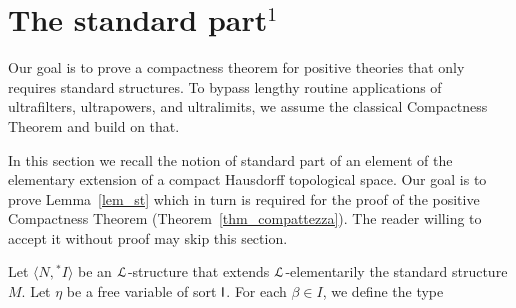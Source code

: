 \documentclass{amsproc}
\begin{document}
\begin{comment}
  \ceq{\hfill M\models\varphi(a)}{\Leftrightarrow}{N\models\varphi(fa)}

  for every $a\in({\rm dom }f)^{|x|}$ and every formula $\varphi(x)\in{\EuScript L}^{\rm p}$ without quantifiers of sort ${\sf H}$.
\end{fact}

\begin{proof}
  The equivalence is trivial for formulas in ${\EuScript L}_{\sf H}$ so we only consider atomic formulas of the form $t\in C$.
  Implication $\Rightarrow$ holds by definition. 
  Vice versa, if $M\models \tau(a)\notin C$ then, by normality,  $M\models \tau(a)\in\tilde{C}$ for some compact $\tilde C$ disjoint of $C$.
  By the definition of partial embedding, $N\models \tau(a)\in\tilde{C}$.
  Hence $N\models \tau(a)\notin C$.
  Induction is immediate.
\end{proof}
  
\end{comment}



\section[The standard part]{The standard part\boldmath$^1$}\label{standard_part}

Our goal is to prove a compactness theorem for positive theories that only requires standard structures.
To bypass lengthy routine applications of ultrafilters, ultrapowers, and ultralimits, %
we assume the classical Compactness Theorem and build on that.

In this section we recall the notion of standard part of an element of the elementary extension of a compact Hausdorff topological space.
Our goal is to prove Lemma~\ref{lem_st} which in turn is required for the proof of the positive Compactness Theorem (Theorem~\ref{thm_compattezza}).
The reader willing to accept it without proof may skip this section.

Let $\langle N, {}^*\!\!I\rangle$ be an ${\EuScript L}$-structure that extends ${\EuScript L}$-elementarily the standard structure $M$. %
Let $\eta$ be a free variable of sort ${\sf I}$.
For each $\beta\in I$, we define the type
\end{document}
